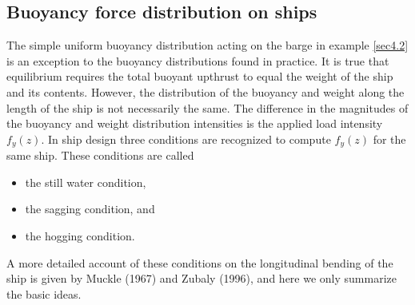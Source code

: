 \documentclass{AeroStructure-ERJohnson}
\begin{document}
{\def\thefigure{4.11}
}


\setcounter{equation}{31}
\subsection{Buoyancy force distribution on ships}\label{sec4.3.2}

The simple uniform buoyancy distribution acting on the barge in example \ref{sec4.2} is an exception to the buoyancy distributions found in practice. It is true that equilibrium requires the total buoyant upthrust to equal the weight of the ship and its contents. However, the distribution of the buoyancy and weight along the length of the ship is not necessarily the same. The difference in the magnitudes of the buoyancy and weight distribution intensities is the applied load intensity $f_{y}(z)$. In ship design three conditions are recognized to compute $f_{y}(z)$ for the same ship. These conditions are called
\begin{itemize}
  \item the still water condition,
  \item the sagging condition, and
  \item the hogging condition.
\end{itemize}
\vspace*{10pt}
\clearpage

A more detailed account of these conditions on the longitudinal bending of the ship is given by Muckle (1967) and Zubaly (1996), and here we only summarize the basic ideas.
\end{document}

